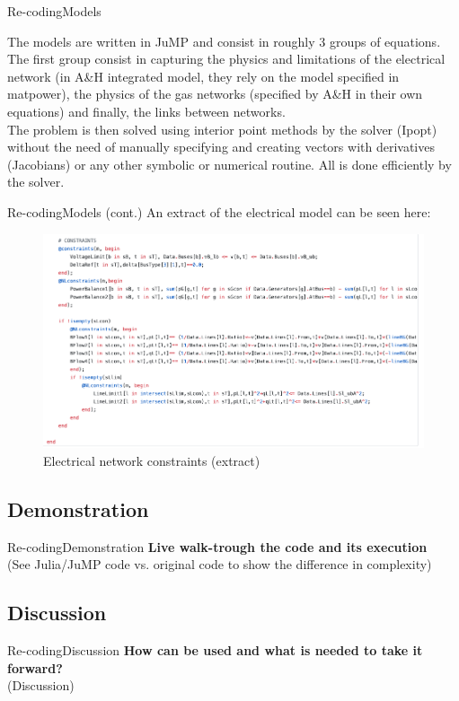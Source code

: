 \documentclass[handout]{beamer}
\begin{document}
\begin{frame}[t]{Re-coding}{Models}

  The models are written in JuMP and consist in roughly 3 groups of equations. The first group consist in capturing the physics and limitations of the electrical network (in A\&H integrated model, they rely on the model specified in matpower), the physics of the gas networks (specified by A\&H in their own equations) and finally, the links between networks.\\[6pt]

  The problem is then solved using interior point methods by the solver (Ipopt) without the need of manually specifying and creating vectors with derivatives (Jacobians) or any other symbolic or numerical routine. All is done efficiently by the solver.
\end{frame}

\begin{frame}[t]{Re-coding}{Models (cont.)}
  An extract of the electrical model can be seen here:

  \begin{figure}
  \begin{center}
  \includegraphics[height=0.55\textheight]{OPF2.png}
  \end{center}
  \caption{Electrical network constraints (extract)}\label{fig:opf}
  \end{figure}

\end{frame}


\subsection{Demonstration}

  \begin{frame}{Re-coding}{Demonstration}
    \textbf{Live walk-trough the code and its execution}\\[12pt]
    (See Julia/JuMP code vs. original code to show the difference in complexity)
  \end{frame}

\subsection{Discussion}
\begin{frame}{Re-coding}{Discussion}
  \textbf{How can be used and what is needed to take it forward?}\\[12pt]
  (Discussion)

\end{frame}
\end{document}
